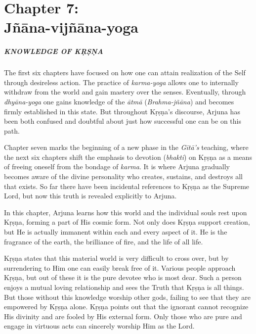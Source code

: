 \chapter{Chapter 7: \\Jñāna-vijñāna-yoga}\label{chap-jnana-vijnana-yoga}

\paragraph*{\MakeUppercase{Knowledge of Kṛṣṇa}}

\noindent The first six chapters have focused on how one can attain realization of the Self through desireless action. The practice of \textit{karma-yoga} allows one to internally withdraw from the world and gain mastery over the senses. Eventually, through \textit{dhyāna-yoga} one gains knowledge of the \textit{ātmā} (\textit{Brahma-jñāna}) and becomes firmly established in this state. But throughout Kṛṣṇa's discourse, Arjuna has been both confused and doubtful about just how successful one can be on this path.

Chapter seven marks the beginning of a new phase in the \textit{Gītā’s} teaching, where the next six chapters shift the emphasis to devotion (\textit{bhakti}) on Kṛṣṇa as a means of freeing oneself from the bondage of \textit{karma}. It is where Arjuna gradually becomes aware of the divine personality who creates, sustains, and destroys all that exists. So far there have been incidental references to Kṛṣṇa as the Supreme Lord, but now this truth is revealed explicitly to Arjuna.

In this chapter, Arjuna learns how this world and the individual souls rest upon Kṛṣṇa, forming a part of His cosmic form. Not only does Kṛṣṇa support creation, but He is actually immanent within each and every aspect of it. He is the fragrance of the earth, the brilliance of fire, and the life of all life.

Kṛṣṇa states that this material world is very difficult to cross over, but by surrendering to Him one can easily break free of it. Various people approach Kṛṣṇa, but out of these it is the pure devotee who is most dear. Such a person enjoys a mutual loving relationship and sees the Truth that Kṛṣṇa is all things. But those without this knowledge worship other gods, failing to see that they are empowered by Kṛṣṇa alone. Kṛṣṇa points out that the ignorant cannot recognize His divinity and are fooled by His external form. Only those who are pure and engage in virtuous acts can sincerely worship Him as the Lord.

